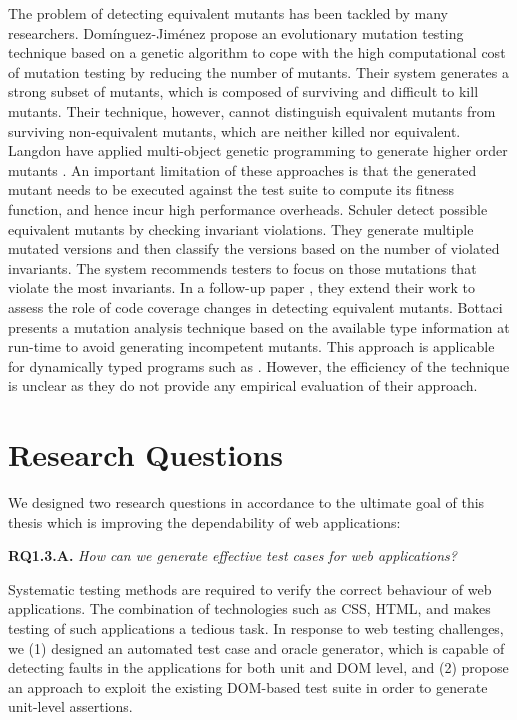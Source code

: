 The problem of detecting equivalent mutants has been tackled by many researchers.
Dom\'inguez-Jim\'enez \etal \cite{dominguez:ist11} propose an evolutionary mutation testing
technique based on a genetic algorithm to cope with the high computational cost of mutation 
testing by reducing the number of mutants. Their system generates a strong subset
of mutants, which is composed of surviving and difficult to kill mutants. 
Their technique, however, cannot distinguish equivalent mutants from surviving non-equivalent mutants, which are neither killed nor
equivalent.
Langdon \etal have applied multi-object genetic programming to generate higher order mutants 
\cite{langdon:jss10}.
An important limitation of these approaches is that the generated
mutant needs to be executed against the test suite to compute its fitness function, and hence incur high performance overheads.
Schuler \etal \cite{schuler:issta09} detect possible equivalent mutants by checking invariant violations. They
generate multiple mutated versions and then classify the versions based on the number of violated invariants.
The system recommends testers to focus on those mutations that violate the most invariants.
In a follow-up paper \cite{schuler:icst10}, they extend their work to assess the role of code coverage changes in detecting equivalent mutants. 
Bottaci \cite{bottaci:icstw10} presents a mutation analysis technique based on the available type information at run-time to avoid generating incompetent mutants. This approach is applicable for dynamically typed programs such as \javascript. However, the efficiency of the technique is unclear as they do not provide any empirical evaluation of their approach. 

\section{Research Questions} \label{Sec:researchq}
We designed two research questions in accordance to the ultimate goal of this thesis which is improving the dependability of \javascript web applications:

{\bf RQ1.3.A.} \emph{How can we generate effective test cases for \javascript web applications?}

Systematic testing methods are required to verify the correct behaviour of web applications. The combination of technologies such as CSS, HTML, and \javascript makes testing of such applications a tedious task.
In response to web testing challenges, we (1) designed an automated test case and oracle generator, which is capable of detecting faults
in the \javascript applications for both unit and DOM level, and (2) propose an approach to exploit the existing DOM-based test suite in order to generate unit-level assertions. 

